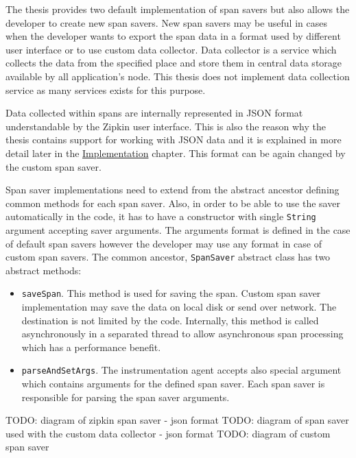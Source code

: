 The thesis provides two default implementation of span savers but also allows the developer to create new span savers. New span savers may be useful in cases when the developer wants to export the span data in a format used by different user interface or to use custom data collector. Data collector is a service which collects the data from the specified place and store them in central data storage available by all application's node. This thesis does not implement data collection service as many services exists for this purpose. 

Data collected within spans are internally represented in JSON format understandable by the Zipkin user interface. This is also the reason why the thesis contains support for working with JSON data and  it is explained in more detail later in the  \hyperref[chap:implementation]{Implementation} chapter. This format can be again changed by the custom span saver.

Span saver implementations need to extend from the abstract ancestor defining common methods for each span saver. Also, in order to be able to use the saver automatically in the code, it has to have a constructor with single \texttt{String} argument accepting saver arguments. The arguments format is defined in the case of default span savers however the developer may use any format in case of custom span savers. The common ancestor, \texttt{SpanSaver} abstract class has two abstract methods:
\begin{itemize}
	\item \texttt{saveSpan}. This method is used for saving the span. Custom span saver implementation may save the data on local disk or send over network. The destination is not limited by the code. Internally, this method is called asynchronously in a separated thread to allow asynchronous span processing which has a performance benefit.
	\item \texttt{parseAndSetArgs}. The instrumentation agent accepts also special argument which contains arguments for the defined span saver. Each span saver is responsible for parsing the span saver arguments.
\end{itemize}

TODO: diagram of zipkin span saver - json format
TODO: diagram of span saver used with the custom data collector - json format
TODO: diagram of custom span saver

